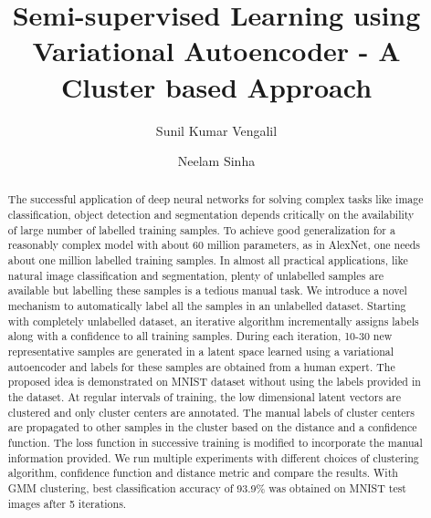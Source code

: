 \documentclass[runningheads]{llncs}
\begin{document}
%
\title{Semi-supervised Learning using Variational Autoencoder - A Cluster based Approach}
%
%
\author{Sunil Kumar Vengalil \and
Neelam Sinha
}
%
%
%
\maketitle              %
%

\begin{abstract}
    The successful application of deep neural networks for solving complex tasks like image classification, object detection and segmentation depends critically on the availability of large number of labelled training samples.
    To achieve good generalization for a reasonably complex model with about 60 million parameters, as in AlexNet, one needs about one million labelled training samples.
    In almost all practical applications, like natural image classification and segmentation, plenty of unlabelled samples are available but labelling these samples is a tedious manual task.
    We introduce a novel mechanism to automatically label all the samples in an unlabelled dataset.
    Starting with completely unlabelled dataset, an iterative algorithm incrementally assigns labels along with a confidence to all training samples.
    During each iteration, 10-30 new representative samples are generated in a latent space learned using a variational autoencoder and labels for these samples are obtained from a human expert.
The proposed  idea  is demonstrated on MNIST dataset without using the labels provided in the dataset.
At regular intervals of training, the low dimensional latent vectors are clustered and only cluster centers are annotated.
    The manual labels of cluster centers are propagated to other samples in the cluster based on the distance and a confidence function.
The loss function in successive training is modified to incorporate the manual information provided.
    We run multiple experiments with different choices of clustering algorithm, confidence function and distance metric and compare the results.
With GMM clustering, best classification accuracy of 93.9\% was obtained on MNIST test images after 5 iterations.

\end{abstract}
%
%
%
\end{document}
